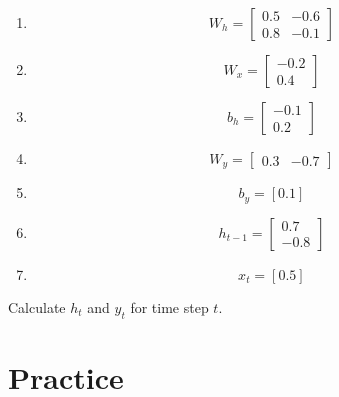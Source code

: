 \documentclass[12pt, xcolor=dvipsnames,svgnames,x11names]{article}
\begin{document}
\begin{enumerate}

    \item 
    \begin{equation}
        W_h = \begin{bmatrix} 0.5 & -0.6 \\ 0.8 & -0.1 \end{bmatrix}
    \end{equation}

    \item \begin{equation}
        W_x = \begin{bmatrix} -0.2 \\ 0.4 \end{bmatrix}
    \end{equation}

    \item \begin{equation}
        b_h = \begin{bmatrix} -0.1 \\ 0.2 \end{bmatrix}
    \end{equation}
    \item \begin{equation}
        W_y = \begin{bmatrix} 0.3 & -0.7 \end{bmatrix}
    \end{equation}

    \item \begin{equation}
        b_y = [0.1]
    \end{equation}

    \item \begin{equation}
        h_{t-1} = \begin{bmatrix} 0.7 \\ -0.8 \end{bmatrix}
    \end{equation}

    \item \begin{equation}
        x_t = [0.5]
    \end{equation}
\end{enumerate}

Calculate $h_t$ and $y_t$ for time step $t$.


\section*{Practice}
\end{document}
